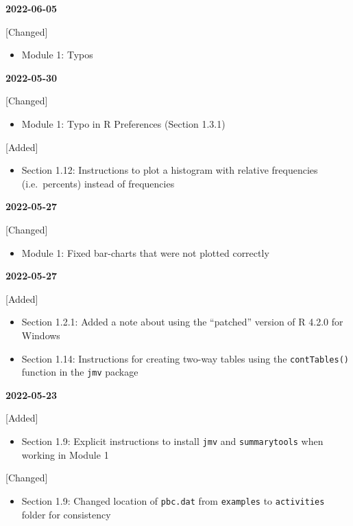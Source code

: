 \documentclass[
]{memoir}
\providecommand{\tightlist}{%
  \setlength{\itemsep}{0pt}\setlength{\parskip}{0pt}}
\begin{document}
\textbf{2022-06-05}

{[}Changed{]}

\begin{itemize}
\tightlist
\item
  Module 1: Typos
\end{itemize}

\textbf{2022-05-30}

{[}Changed{]}

\begin{itemize}
\tightlist
\item
  Module 1: Typo in R Preferences (Section 1.3.1)
\end{itemize}

{[}Added{]}

\begin{itemize}
\tightlist
\item
  Section 1.12: Instructions to plot a histogram with relative frequencies (i.e.~percents) instead of frequencies
\end{itemize}

\textbf{2022-05-27}

{[}Changed{]}

\begin{itemize}
\tightlist
\item
  Module 1: Fixed bar-charts that were not plotted correctly
\end{itemize}

\textbf{2022-05-27}

{[}Added{]}

\begin{itemize}
\tightlist
\item
  Section 1.2.1: Added a note about using the ``patched'' version of R 4.2.0 for Windows
\item
  Section 1.14: Instructions for creating two-way tables using the \texttt{contTables()} function in the \texttt{jmv} package
\end{itemize}

\textbf{2022-05-23}

{[}Added{]}

\begin{itemize}
\tightlist
\item
  Section 1.9: Explicit instructions to install \texttt{jmv} and \texttt{summarytools} when working in Module 1
\end{itemize}

{[}Changed{]}

\begin{itemize}
\tightlist
\item
  Section 1.9: Changed location of \texttt{pbc.dat} from \texttt{examples} to \texttt{activities} folder for consistency
\end{itemize}
\end{document}
